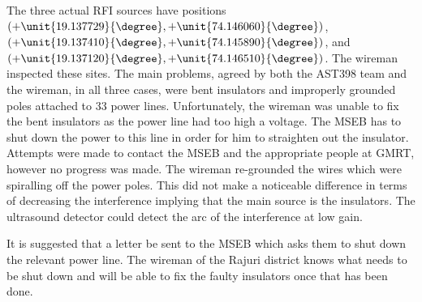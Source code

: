 \documentclass[a4paper,12pt]{article}
\begin{document}
                                                                                                                                                                                                                                                                                                                                                                                                                                                                                                                                                                                                                                                                                                                                                                                                                                                                                                                                                                                                    The three actual RFI sources have positions $(+\unit{19.137729}{\degree},+\unit{74.146060}{\degree})$, $(+\unit{19.137410}{\degree},+\unit{74.145890}{\degree})$, and $(+\unit{19.137120}{\degree},+\unit{74.146510}{\degree})$. The wireman inspected these sites. The main problems, agreed by both the AST398 team and the wireman, in all three cases, were bent insulators and improperly grounded poles attached to \unit{33}{\kilo\volt} power lines. Unfortunately, the wireman was unable to fix the bent insulators as the power line had too high a voltage. The MSEB has to shut down the power to this line in order for him to straighten out the insulator. Attempts were made to contact the MSEB and the appropriate people at GMRT, however no progress was made. The wireman re-grounded the wires which were spiralling off the power poles. This did not make a noticeable difference in terms of decreasing the interference implying that the main source is the insulators. The ultrasound detector could detect the arc of the interference at low gain. 

                                                                                                                                                                                                                                                                                                                                                                                                                                                                                                                                                                                                                                                                                                                                                                                                                                                                                                                                                                                                                                   It is suggested that a letter be sent to the MSEB which asks them to shut down the relevant power line. The wireman of the Rajuri district knows what needs to be shut down and will be able to fix the faulty insulators once that has been done.  
\end{document}
